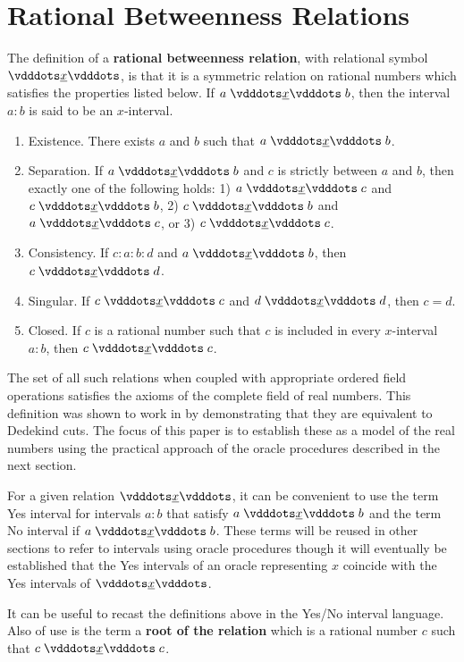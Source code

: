 \documentclass[12pt]{article}
\begin{document}
\section{Rational Betweenness Relations}

The definition of a \textbf{rational betweenness relation}, with relational symbol $\xrel$, is that it is a symmetric relation on rational numbers which satisfies the properties listed below. If $a \xrel b$, then the interval $a:b$ is said to be an $x$-interval. 
\begin{enumerate}
    \item Existence. There exists $a$ and $b$ such that $a\xrel b$.
    \item Separation. If $a \xrel b$ and $c$ is strictly between $a$ and $b$, then exactly one of the following holds: 1) $a \xrel c$ and \sout{$c \xrel b$}, 2) $c \xrel b$ and \sout{$a \xrel c$}, or 3) $c \xrel c$. 
    \item Consistency. If $c : a : b : d$ and $a \xrel b$, then $c \xrel d$. 
    \item Singular. If $c \xrel c$ and $d \xrel d$, then $c=d$. 
    \item Closed. If $c$ is a rational number such that $c$ is included in every $x$-interval $a:b$, then  $c \xrel c$. 
\end{enumerate}

The set of all such relations when coupled with appropriate ordered field operations satisfies the axioms of the complete field of real numbers. This definition was shown to work in \cite{taylor24dedekind} by demonstrating that they are equivalent to Dedekind cuts. The focus of this paper is to establish these as a model of the real numbers using the practical approach of the oracle procedures described in the next section. 

For a given relation $\xrel$, it can be convenient to use the term Yes interval for intervals $a:b$ that satisfy $a \xrel b$ and the term No interval if \sout{$ a \xrel b$}. These terms will be reused in other sections to refer to intervals using oracle procedures though it will eventually be established that the Yes intervals of an oracle representing $x$ coincide with the Yes intervals of $\xrel$.

It can be useful to recast the definitions above in the Yes/No interval language. Also of use is the term a \textbf{root of the relation} which is a rational number $c$ such that $c \xrel c$.
\end{document}
